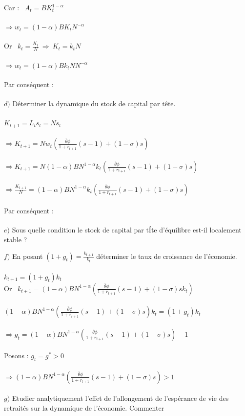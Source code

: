 \documentclass[11pt,twoside,a4paper]{article}
\begin{document}
Car : \ $A_t=BK^{1-\alpha}_t$\\ \\
$ \Rightarrow w_t=(1-\alpha)B K_tN^{-\alpha}$\\ \\
Or \ $k_t=\frac{K_t}{N} \ \Rightarrow \ K_t=k_tN$\\ \\
$ \Rightarrow w_t=(1-\alpha)B k_tNN^{-\alpha}$\\ \\
Par conséquent : \ \\ \\

$d)$ Déterminer la dynamique du stock de capital par t\^{e}te.\\ \\
$K_{t+1}=L_ts_t=Ns_t$\\ \\
$\Rightarrow K_{t+1}=Nw_t\left(\frac{\overline{\theta}\phi}{1+r_{t+1}}(s-1) +(1- \sigma)s \right)$\\ \\
$\Rightarrow K_{t+1}=N(1-\alpha)B N^{1-\alpha}k_t\left(\frac{\overline{\theta}\phi}{1+r_{t+1}}(s-1) +(1- \sigma)s \right)$\\ \\
$\Rightarrow \frac{K_{t+1}}{N}=(1-\alpha)B N^{1-\alpha}k_t\left(\frac{\overline{\theta}\phi}{1+r_{t+1}}(s-1) +(1- \sigma)s \right)$\\ \\
Par conséquent : \ \\ \\
$e)$ Sous quelle condition le stock de capital par tÍte d'équilibre est-il localement stable ?





$f)$ En posant  $(1+g_t)=\frac{k_{t+1}}{k_t}$ déterminer le taux de croissance de l'économie.\\ \\
$k_{t+1}=(1+g_t)k_t$\\
Or \ $k_{t+1}=(1-\alpha)B N^{1-\alpha}\left(\frac{\overline{\theta}\phi}{1+r_{t+1}}(s-1) +(1- \sigma)sk_t \right)$\\ \\
$(1-\alpha)B N^{1-\alpha}\left(\frac{\overline{\theta}\phi}{1+r_{t+1}}(s-1) +(1- \sigma)s \right)k_t=(1+g_t)k_t$\\ \\
$\Rightarrow g_t=(1-\alpha)B N^{1-\alpha}\left(\frac{\overline{\theta}\phi}{1+r_{t+1}}(s-1) +(1- \sigma)s \right)-1$\\ \\
Posons : $g_t=g^*>0$\\ \\
$\Rightarrow (1-\alpha)B N^{1-\alpha}\left(\frac{\overline{\theta}\phi}{1+r_{t+1}}(s-1) +(1- \sigma)s \right)>1$\\ \\


$g)$ Etudier analytiquement l'effet de l'allongement de l'espérance de vie des
retraités sur la dynamique de l'économie. Commenter
\end{document}
